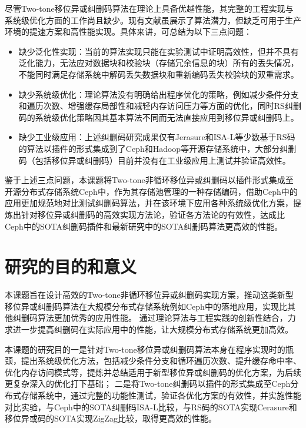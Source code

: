 尽管Two-tone移位异或纠删码算法在理论上具备优越性能，其完整的工程实现与系统级优化方面的工作尚且缺少。现有文献虽展示了算法潜力，但缺乏可用于生产环境的提速方案和高性能实现。具体来讲，可总结为以下三点问题：

\begin{itemize}
    \item 缺少泛化性实现：当前的算法实现只能在实验测试中证明高效性，但并不具有泛化能力，无法应对数据块和校验块（存储冗余信息的块）所有的丢失情况，不能同时满足存储系统中解码丢失数据块和重新编码丢失校验块的双重需求。
    \item 缺少系统级优化：理论算法没有明确给出程序优化的策略，例如减少条件分支和遍历次数、增强缓存局部性和减轻内存访问压力等方面的优化，同时RS纠删码的系统级优化策略因其基本算法不同而无法直接应用到移位异或纠删码上。
    \item 缺少工业级应用：上述纠删码研究成果仅有Jerasure和ISA-L等少数基于RS码的算法以插件的形式集成到了Ceph和Hadoop等开源存储系统中，大部分纠删码（包括移位异或纠删码）目前并没有在工业级应用上测试并验证高效性。
\end{itemize}

鉴于上述三点问题，本课题将Two-tone非循环移位异或纠删码以插件形式集成至开源分布式存储系统Ceph中，作为其存储池管理的一种存储编码，借助Ceph中的应用更加规范地对比测试纠删码算法，并在该环境下应用各种系统级优化方案，提炼出针对移位异或纠删码的高效实现方法论，验证各方法论的有效性，达成比Ceph中的SOTA纠删码插件和最新研究中的SOTA纠删码算法更高效的性能。

\section{研究的目的和意义}

本课题旨在设计高效的Two-tone非循环移位异或纠删码实现方案，推动这类新型移位异或纠删码算法在大规模分布式存储系统例如Ceph中的落地应用，实现比其他纠删码算法更加优秀的应用性能。
通过理论算法与工程实践的创新性结合，力求进一步提高纠删码在实际应用中的性能，让大规模分布式存储系统更加高效。

本课题的研究目的一是针对Two-tone移位异或纠删码算法本身在程序实现时的瓶颈，提出系统级优化方法，包括减少条件分支和循环遍历次数、提升缓存命中率、优化内存访问模式等，提炼并总结适用于新型移位异或纠删码的优化方案，为后续更复杂深入的优化打下基础；
二是将Two-tone纠删码以插件的形式集成至Ceph分布式存储系统中，通过完整的功能性测试，验证各优化方案的有效性，并实施性能对比实验，与Ceph中的SOTA纠删码ISA-L比较，与RS码的SOTA实现Cerasure和移位异或码的SOTA实现ZigZag比较，取得更高效的性能。

